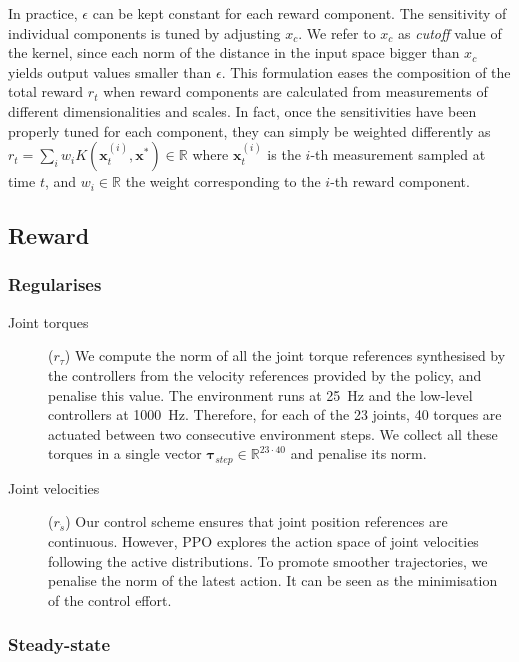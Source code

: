\noindent
In practice, $\epsilon$ can be kept constant for each reward component.
The sensitivity of individual components is tuned by adjusting $x_c$.
We refer to $x_c$ as \emph{cutoff} value of the kernel, since each norm of the distance in the input space bigger than $x_c$ yields output values smaller than $\epsilon$.
This formulation eases the composition of the total reward $r_t$ when reward components are calculated from measurements of different dimensionalities and scales.
In fact, once the sensitivities have been properly tuned for each component, they can simply be weighted differently as 
$
r_t = \sum_i w_i K(\mathbf{x}^{(i)}_t, \mathbf{x}^*) \in \mathbb{R}
$
where $\mathbf{x}^{(i)}_t$ is the $i$-th measurement sampled at time $t$, and $w_i \in \mathbb{R}$ the weight corresponding to the $i$-th reward component.

\subsection{Reward}

\subsubsection{Regularises}

\begin{description}

\item[Joint torques]\!($r_\tau$)\;
%
We compute the norm of all the joint torque references synthesised by the \pid controllers from the velocity references provided by the policy, and penalise this value.
The environment runs at 25~Hz and the low-level controllers at 1000~Hz.
Therefore, for each of the 23 joints, 40 torques are actuated between two consecutive environment steps.
We collect all these torques in a single vector $\boldsymbol{\tau}_{step} \in \mathbb{R}^{23\cdot40}$ and penalise its norm.

\item[Joint velocities]\!($r_{\dot{s}}$)\;
%
Our control scheme ensures that joint position references are continuous.
However, \ac{PPO} explores the action space of joint velocities following the active distributions.
To promote smoother trajectories, we penalise the norm of the latest action.
It can be seen as the minimisation of the control effort.

\end{description}

\subsubsection{Steady-state}

